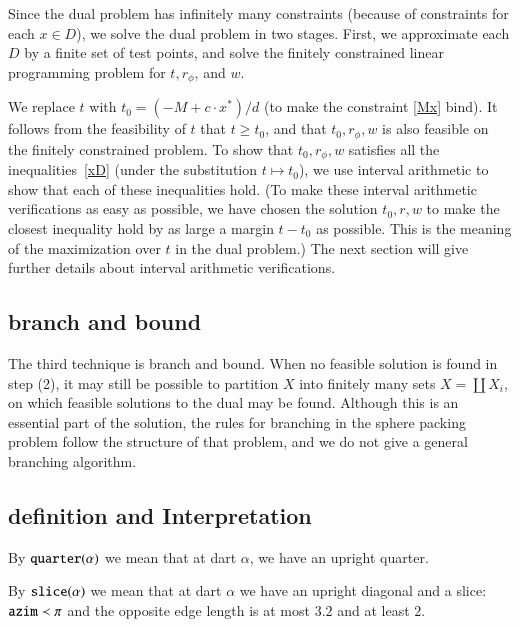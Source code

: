 Since the dual problem has infinitely many constraints (because of
constraints for each $x\in D$), we solve the dual problem in two
stages. First, we approximate each $D$ by a finite set of test
points, and solve the finitely constrained linear programming
problem for $t, r_\phi$, and $w$.

We replace $t$ with $t_0 = (-M +c\cdot x^*)/d$ (to make the
constraint \ref{Mx} bind).  It follows from the feasibility of $t$
that $t\ge t_0$, and that $t_0,r_\phi,w$ is also feasible on the
finitely constrained problem. To show that $t_0,r_\phi,w$
satisfies all the inequalities~\ref{xD} (under the substitution
$t\mapsto t_0$), we use interval arithmetic to show that each of
these inequalities hold. (To make these interval arithmetic
verifications as easy as possible, we have chosen the solution
$t_0,r,w$ to make the closest inequality hold by as large a margin
$t-t_0$ as possible. This is the meaning of the maximization over
$t$ in the dual problem.)  The next section will give further
details about interval arithmetic verifications.

\subsection{branch and bound}
The third technique is branch and bound.  When no feasible
solution is found in step (2), it may still be possible to
partition $X$ into finitely many sets $X = \coprod X_i$, on which
feasible solutions to the dual may be found.  Although this is an
essential part of the solution, the rules for branching in the
sphere packing problem follow the structure of that problem, and we do
not give a general branching algorithm.


\subsection{definition and Interpretation}

\begin{definition}[quarter]
By ${\operatorname{{\texttt{quarter}}}}(\alpha)$ we mean that at dart $\alpha$, we have
an upright quarter.
\end{definition}

\begin{definition}[slice]
By ${\operatorname{{\texttt{slice}}}}(\alpha)$ we mean that at dart $\alpha$ we have an upright
diagonal and a slice: ${\operatorname{{\texttt{azim}}}}\prec \pi$ and
the opposite edge length is at most $3.2$ and at least $2$.
\end{definition}


